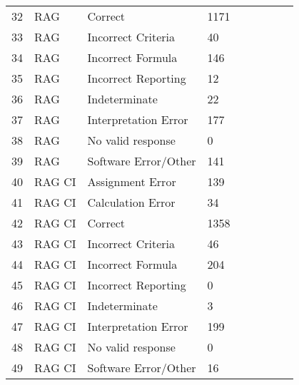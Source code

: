 \begin{tabular}{|l|l|l|l|l|l|l|l|l|}
32 & RAG & Correct & 1171 \\
33 & RAG & Incorrect Criteria & 40 \\
34 & RAG & Incorrect Formula & 146 \\
35 & RAG & Incorrect Reporting & 12 \\
36 & RAG & Indeterminate & 22 \\
37 & RAG & Interpretation Error & 177 \\
38 & RAG & No valid response & 0 \\
39 & RAG & Software Error/Other & 141 \\
40 & RAG  CI & Assignment Error & 139 \\
41 & RAG  CI & Calculation Error & 34 \\
42 & RAG  CI & Correct & 1358 \\
43 & RAG  CI & Incorrect Criteria & 46 \\
44 & RAG  CI & Incorrect Formula & 204 \\
45 & RAG  CI & Incorrect Reporting & 0 \\
46 & RAG  CI & Indeterminate & 3 \\
47 & RAG  CI & Interpretation Error & 199 \\
48 & RAG  CI & No valid response & 0 \\
49 & RAG  CI & Software Error/Other & 16 \\
\bottomrule
\end{tabular}
